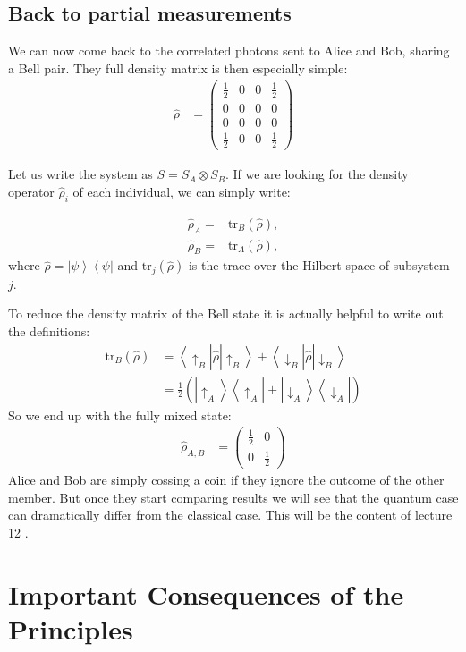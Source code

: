 \documentclass[10pt]{article}
\let\cite\citep
\providecommand\citep{\cite}
\newcommand{\bra}[1]{\ensuremath{\left\langle#1\right|}}
\newcommand{\ket}[1]{\ensuremath{\left|#1\right\rangle}}
\newcommand{\rhohat}{\hat{\rho}}
\newcommand{\trarb}[2]{\mathrm{tr}_{#1}(#2)}
\begin{document}
\subsection{Back to partial measurements}

We can now come back to the correlated photons sent to Alice and Bob, sharing a Bell pair. They full density matrix is then especially simple:
\begin{align}
  \rhohat &= \left(\begin{array}{cccc}
  \frac{1}{2}& 0& 0 &\frac{1}{2}\\
  0 & 0 & 0& 0\\
  0&0&0&0\\
    \frac{1}{2}&0&0&\frac{1}{2}
  \end{array}\right)
\end{align}

Let us write the system as $S = S_A \otimes S_B$.  If we are looking for the density operator $\rhohat_i$ of each individual, we can simply write:

\begin{align}
\rhohat_A=&\trarb{B}{\rhohat},\\
\rhohat_B=&\trarb{A}{\rhohat},
\end{align}
where $\hat{\rho}=\ket{\psi}\bra{\psi}$ and $\trarb{j}{\rhohat}$ is the trace over the Hilbert space of subsystem $j$. 

To reduce the density matrix of the Bell state it is actually helpful to write out the definitions:
\begin{align}
\trarb{B}{\rhohat} &= \bra{\uparrow_B}\rhohat\ket{\uparrow_B}+\bra{\downarrow_B}\rhohat\ket{\downarrow_B}\\
&=\frac{1}{2}\left(\ket{\uparrow_A}\bra{\uparrow_A}+\ket{\downarrow_A}\bra{\downarrow_A}\right)
\end{align}
So we end up with the fully mixed state:
\begin{align}
  \rhohat_{A,B} &= \left(\begin{array}{cc}
  \frac{1}{2}&0\\
  0&\frac{1}{2}
  \end{array}\right)
\end{align}
Alice and Bob are simply cossing a coin if they ignore the outcome of the other member. But once they start comparing results we will see that the quantum case can dramatically differ from the classical case. This will be the content of lecture 12  \cite{entanglement}.

\section{Important Consequences of the Principles}
\end{document}
